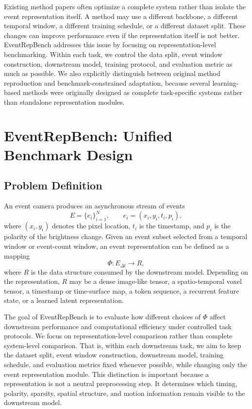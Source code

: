 \documentclass[letterpaper]{article}
\begin{document}
Existing method papers often optimize a complete system rather than isolate the event representation itself. A method may use a different backbone, a different temporal window, a different training schedule, or a different dataset split. These changes can improve performance even if the representation itself is not better. EventRepBench addresses this issue by focusing on representation-level benchmarking. Within each task, we control the data split, event window construction, downstream model, training protocol, and evaluation metric as much as possible. We also explicitly distinguish between original method reproduction and benchmark-constrained adaptation, because several learning-based methods were originally designed as complete task-specific systems rather than standalone representation modules.

\section{EventRepBench: Unified Benchmark Design}
\subsection{Problem Definition}
An event camera produces an asynchronous stream of events
\[
E=\{e_i\}_{i=1}^{N}, \qquad e_i=(x_i,y_i,t_i,p_i),
\]
where $(x_i,y_i)$ denotes the pixel location, $t_i$ is the timestamp, and $p_i$ is the polarity of the brightness change. Given an event subset selected from a temporal window or event-count window, an event representation can be defined as a mapping
\[
\Phi: E_{\Delta t}\rightarrow R,
\]
where $R$ is the data structure consumed by the downstream model. Depending on the representation, $R$ may be a dense image-like tensor, a spatio-temporal voxel tensor, a timestamp or time-surface map, a token sequence, a recurrent feature state, or a learned latent representation.

The goal of EventRepBench is to evaluate how different choices of $\Phi$ affect downstream performance and computational efficiency under controlled task protocols. We focus on representation-level comparison rather than complete system-level comparison. That is, within each downstream task, we aim to keep the dataset split, event window construction, downstream model, training schedule, and evaluation metrics fixed whenever possible, while changing only the event representation module. This distinction is important because a representation is not a neutral preprocessing step. It determines which timing, polarity, sparsity, spatial structure, and motion information remain visible to the downstream model.
\end{document}
